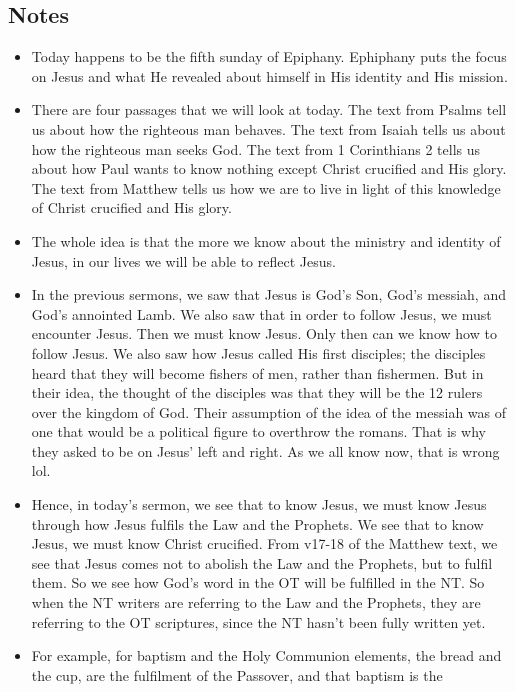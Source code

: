 \subsection*{Notes}
\begin{itemize}
  \item{Today happens to be the fifth sunday of Epiphany.  Ephiphany puts the
  focus on Jesus and what He revealed about himself in His identity and His
  mission.}
  \item{There are four passages that we will look at today.  The text from
  Psalms tell us about how the righteous man behaves.  The text from Isaiah
  tells us about how the righteous man seeks God.  The text from 1
  Corinthians 2 tells us about how Paul wants to know nothing except Christ
  crucified and His glory.  The text from Matthew tells us how we are to live
  in light of this knowledge of Christ crucified and His glory.}
  \item{The whole idea is that the more we know about the ministry and
  identity of Jesus, in our lives we will be able to reflect Jesus.}
  \item{In the previous sermons, we saw that Jesus is God's Son, God's
  messiah, and God's annointed Lamb.  We also saw that in order to follow
  Jesus, we must encounter Jesus.  Then we must know Jesus.  Only then can we
  know how to follow Jesus.  We also saw how Jesus called His first
  disciples; the disciples heard that they will become fishers of men, rather
  than fishermen.  But in their idea, the thought of the disciples was that
  they will be the 12 rulers over the kingdom of God.  Their assumption of
  the idea of the messiah was of one that would be a political figure to
  overthrow the romans.  That is why they asked to be on Jesus' left and
  right.  As we all know now, that is wrong lol.}
  \item{Hence, in today's sermon, we see that to know Jesus, we must know
  Jesus through how Jesus fulfils the Law and the Prophets.  We see that to
  know Jesus, we must know Christ crucified.  From v17-18 of the Matthew
  text, we see that Jesus comes not to abolish the Law and the Prophets, but
  to fulfil them.  So we see how God's word in the OT will be fulfilled in
  the NT.  So when the NT writers are referring to the Law and the Prophets,
  they are referring to the OT scriptures, since the NT hasn't been fully
  written yet.  }
  \item{For example, for baptism and the Holy Communion elements, the bread
  and the cup, are the fulfilment of the Passover, and that baptism is the
}
\end{itemize}
